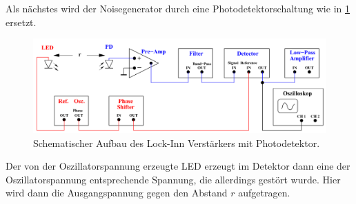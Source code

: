 \noindent Als nächstes wird der Noisegenerator durch eine Photodetektorschaltung wie in \ref{fig:photo} ersetzt.
\begin{figure}[H]
    \centering
    \includegraphics{Bilder/PhotoLockInn}
    \caption{Schematischer Aufbau des Lock-Inn Verstärkers mit Photodetektor. \cite{V303}}
    \label{fig:photo}
\end{figure}
Der von der Oszillatorspannung erzeugte LED erzeugt im Detektor dann eine der Oszillatorspannung entsprechende Spannung, die 
allerdings gestört wurde. Hier wird dann die Ausgangspannung gegen den Abstand $r$ aufgetragen.

\label{sec:Durchführung}
